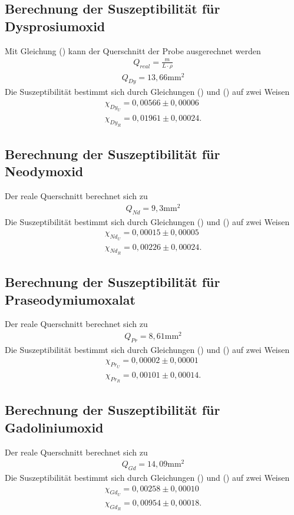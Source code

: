 \subsection{Berechnung der Suszeptibilität für Dysprosiumoxid}
Mit Gleichung () kann der Querschnitt der Probe ausgerechnet werden
\begin{align*}
Q_{real} = \frac{m}{L \cdot \rho}
\end{align*}
\begin{align*}
Q_{Dy} = 13,66 \si{\milli\meter}^2
\end{align*}
Die Suszeptibilität bestimmt sich durch Gleichungen () und () auf zwei Weisen
\begin{align*}
\chi_{Dy_U} = 0,00566 \pm 0,00006 \\
\chi_{Dy_R} = 0,01961 \pm 0,00024 .
\end{align*}

\subsection{Berechnung der Suszeptibilität für Neodymoxid}
Der reale Querschnitt berechnet sich zu
\begin{align*}
Q_{Nd} = 9,3 \si{\milli\meter}^2
\end{align*}
Die Suszeptibilität bestimmt sich durch Gleichungen () und () auf zwei Weisen
\begin{align*}
\chi_{Nd_U} = 0,00015 \pm 0,00005 \\
\chi_{Nd_R} = 0,00226 \pm 0,00024 .
\end{align*}

\subsection{Berechnung der Suszeptibilität für Praseodymiumoxalat}
Der reale Querschnitt berechnet sich zu
\begin{align*}
Q_{Pr} = 8,61 \si{\milli\meter}^2
\end{align*}
Die Suszeptibilität bestimmt sich durch Gleichungen () und () auf zwei Weisen
\begin{align*}
\chi_{Pr_U} = 0,00002 \pm 0,00001 \\
\chi_{Pr_R} = 0,00101 \pm 0,00014 .
\end{align*}

\subsection{Berechnung der Suszeptibilität für Gadoliniumoxid}
Der reale Querschnitt berechnet sich zu
\begin{align*}
Q_{Gd} = 14,09 \si{\milli\meter}^2
\end{align*}
Die Suszeptibilität bestimmt sich durch Gleichungen () und () auf zwei Weisen
\begin{align*}
\chi_{Gd_U} = 0,00258 \pm 0,00010 \\
\chi_{Gd_R} = 0,00954 \pm 0,00018 .
\end{align*}


